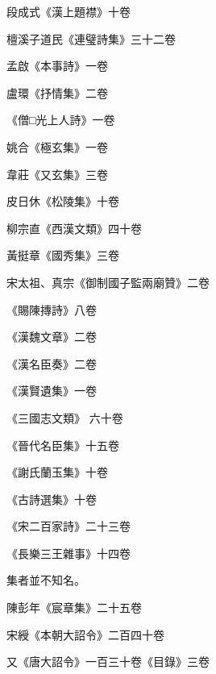 \begin{pinyinscope}
 段成式《漢上題襟》十卷



 檀溪子道民《連璧詩集》三十二卷



 孟啟《本事詩》一卷



 盧環《抒情集》二卷



 《僧□光上人詩》一卷



 姚合《極玄集》一卷



 韋莊《又玄集》三卷



 皮日休《松陵集》十卷



 柳宗直《西漢文類》四十卷



 黃挺章《國秀集》三卷



 宋太祖、真宗《御制國子監兩廟贊》二卷



 《賜陳摶詩》八卷



 《漢魏文章》二卷



 《漢名臣奏》二卷



 《漢賢遺集》一卷



 《三國志文類》
 六十卷



 《晉代名臣集》十五卷



 《謝氏蘭玉集》十卷



 《古詩選集》十卷



 《宋二百家詩》二十三卷



 《長樂三王雜事》十四卷



 集者並不知名。



 陳彭年《宸章集》二十五卷



 宋綬《本朝大詔令》二百四十卷



 又《唐大詔令》一百三十卷《目錄》三卷




\end{pinyinscope}
